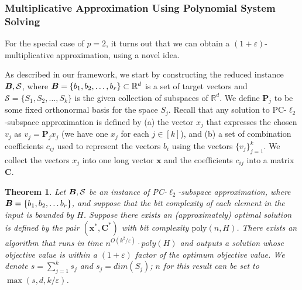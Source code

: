 \documentclass[11pt]{article}
\theoremstyle{plain}
\newtheorem{theorem}{Theorem}[section]
\theoremstyle{plain}
\theoremstyle{definition}
\theoremstyle{plain}
\theoremstyle{remark}
\newcommand{\RR}{\mathbb{R}}
\newcommand{\cS}{\mathcal{S}}
\newcommand{\eps}{\varepsilon}
\DeclareRobustCommand{\fairSAp}[1]{PC-$\ell_{#1}$-subspace approximation}
\begin{document}
\subsubsection{Multiplicative Approximation Using Polynomial System Solving}\label{sec:fairsa-mult}
For the special case of $p=2$, it turns out that we can obtain a $(1+\eps)$-multiplicative approximation, using a novel idea.  

As described in our framework, we start by constructing  the reduced instance $\bfB, \cS$, where $\bfB = \{b_1, b_2, \dots, b_r\} \subset \RR^d$ is a set of target vectors and $\cS = \{ S_1, S_2,  \dots, S_k\}$ is the given collection of subspaces of $\RR^d$. We define $\bm{P}_j$ to be some fixed orthonormal basis for the space $S_j$. Recall that any solution to \fairSAp{2} is defined by (a) the vector $x_j$ that expresses the chosen $v_j$ as $v_j = \bm{P}_j x_j$ (we have one $x_j$ for each $j \in [k]$), and (b) a set of combination coefficients $c_{ij}$ used to represent the vectors $b_i$ using the vectors $\{v_j\}_{j=1}^k$. We collect the vectors $x_j$ into one long vector $\bm{x}$ and the coefficients $c_{ij}$ into a matrix $\bm{C}$. 

\begin{theorem}\label{thm:multiplicative}
Let $\bfB, \cS$ be an instance of \fairSAp{2}, where $\bm{B} = \{b_1, b_2, \dots b_r\}$, and suppose that the bit complexity of each element in the input is bounded by $H$. Suppose there exists an (approximately) optimal solution is defined by the pair $(\bm{x}^*, \bm{C}^*)$ with bit complexity $\text{poly}(n, H)$.  There exists an algorithm that runs in time $n^{O(k^2/\varepsilon)}\cdot poly(H)$ and outputs a solution whose objective value is within a $(1+\eps)$ factor of the optimum objective value. We denote $s=\sum_{j=1}^k s_j$ and $s_j =dim(S_j)$; $n$ for this result can be set to $\max(s,d,  k/\eps)$. 
\end{theorem}
\end{document}
